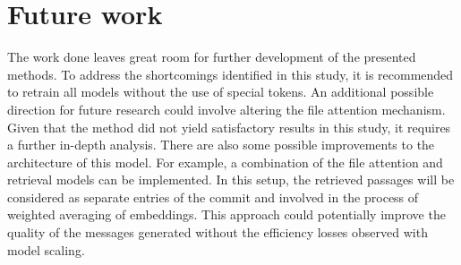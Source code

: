 \section{Future work}
The work done leaves great room for further development of the presented methods. To address the shortcomings identified in this study, it is recommended to retrain all models without the use of special tokens. An additional possible direction for future research could involve altering the file attention mechanism. Given that the method did not yield satisfactory results in this study, it requires a further in-depth analysis. There are also some possible improvements to the architecture of this model. For example, a combination of the file attention and retrieval models can be implemented. In this setup, the retrieved passages will be considered as separate entries of the commit and involved in the process of weighted averaging of embeddings. This approach could potentially improve the quality of the messages generated without the efficiency losses observed with model scaling.